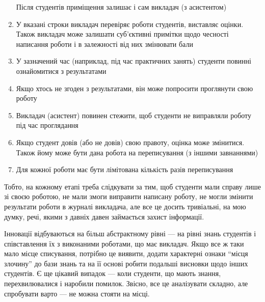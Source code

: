 \begin{enumerate}
        Після студентів приміщення залишає і сам викладач (з асистентом)
    \item
        У вказані строки викладач перевіряє роботи студентів, виставляє оцінки.
        Також викладач може залишати суб’єктивні примітки щодо чесності
        написання роботи і в залежності від них змінювати бали
    \item
        У зазначений час (наприклад, під час практичних занять) студенти повинні
        ознайомитися з результатами
    \item
        Якщо хтось не згоден з результатами, він може попросити проглянути свою
        роботу
    \item
        Викладач (асистент) повинен стежити, щоб студенти не виправляли роботу
        під час проглядання
    \item
        Якщо студент довів (або не довів) свою правоту, оцінка може змінитися.
        Також йому може бути дана робота на переписування (з іншими завнаннями)
    \item
        Для кожної роботи має бути лімітована кількість разів переписування
\end{enumerate}

Тобто, на кожному етапі треба слідкувати за тим, щоб студенти мали справу лише
зі своєю роботою, не мали змоги виправити написану роботу, не могли змінити
результати роботи в журналі викладача, але все це досить тривіальні, на мою
думку, речі, якими з давніх давен займається захист інформації.

Інновації відбуваються на більш абстрактному рівні --- на рівні знань студентів
і співставлення їх з виконаними роботами, що має викладач.
Якщо все ж таки мало місце списування, потрібно це виявити, додати характерні
ознаки ``місця злочину'' до бази знань та на її основі робити подальші висновки
щодо інших студентів.
Є ще цікавий випадок --- коли студенти, що мають знання, перехвилювалися і
наробили помилок.
Звісно, все це аналізувати складно, але спробувати варто --- не можна стояти на
місці.
